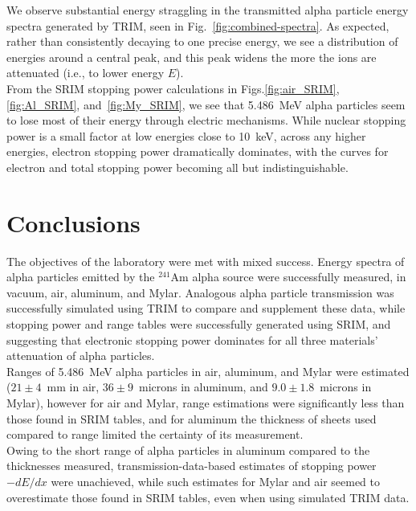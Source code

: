 \documentclass[12pt]{article}
\newcommand{\figref}[1]{Fig.~\ref{#1}}
\newcommand{\AmSrc}{\xspace$^{241}$Am\xspace}
\begin{document}
We observe substantial energy straggling in the transmitted alpha particle energy spectra generated by TRIM, seen in \figref{fig:combined-spectra}.
As expected, rather than consistently decaying to one precise energy, we see a distribution of energies around a central peak, and this peak widens the more the ions are attenuated (i.e., to lower energy $E$).\\

From the SRIM stopping power calculations in Figs.\ref{fig:air_SRIM}, \ref{fig:Al_SRIM}, and~\ref{fig:My_SRIM}, we see that 5.486~MeV alpha particles seem to lose most of their energy through electric mechanisms.
While nuclear stopping power is a small factor at low energies close to 10~keV, across any higher energies, electron stopping power dramatically dominates, with the curves for electron and total stopping power becoming all but indistinguishable.

\section{Conclusions}\label{sec:conc}

The objectives of the laboratory were met with mixed success.
Energy spectra of alpha particles emitted by the \AmSrc alpha source were successfully measured, in vacuum, air, aluminum, and Mylar.
Analogous alpha particle transmission was successfully simulated using TRIM to compare and supplement these data, while stopping power and range tables were successfully generated using SRIM, and suggesting that electronic stopping power dominates for all three materials' attenuation of alpha particles.\\

Ranges of 5.486~MeV alpha particles in air, aluminum, and Mylar were estimated ($21\pm4$~mm in air, $36\pm9$~microns in aluminum, and $9.0\pm1.8$~microns in Mylar), however for air and Mylar, range estimations were significantly less than those found in SRIM tables, and for aluminum the thickness of sheets used compared to range limited the certainty of its measurement.\\

Owing to the short range of alpha particles in aluminum compared to the thicknesses measured, transmission-data-based estimates of stopping power $-dE/dx$ were unachieved, while such estimates for Mylar and air seemed to overestimate those found in SRIM tables, even when using simulated TRIM data.\\
\end{document}
